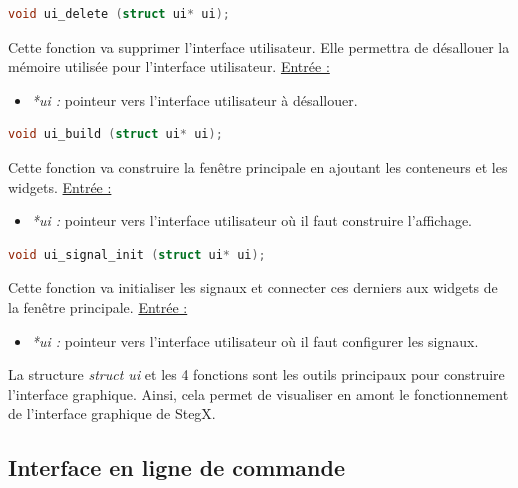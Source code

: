 \documentclass[11pt]{article}
\begin{document}
\begin{lstlisting}[language=c]
void ui_delete (struct ui* ui);
\end{lstlisting}

Cette fonction va supprimer l'interface utilisateur. Elle permettra de 
désallouer la mémoire utilisée pour l'interface utilisateur. 
\newline
\underline{Entrée :} 
\begin{itemize}
\item \textit{*ui :} pointeur vers l'interface utilisateur à désallouer. 
\newline 
\end{itemize}

\begin{lstlisting}[language=c]
void ui_build (struct ui* ui);
\end{lstlisting}

Cette fonction va construire la fenêtre principale en ajoutant les conteneurs 
et les widgets. 
\newline
\underline{Entrée :} 
\begin{itemize}
\item \textit{*ui :} pointeur vers l'interface utilisateur où il faut construire 
l'affichage. 
\newline 
\end{itemize}

\begin{lstlisting}[language=c]
void ui_signal_init (struct ui* ui);
\end{lstlisting}

Cette fonction va initialiser les signaux et connecter ces derniers aux 
widgets de la fenêtre principale. 
\newline
\underline{Entrée :} 
\begin{itemize}
\item \textit{*ui :} pointeur vers l'interface utilisateur où il faut 
configurer les signaux. 
\newline 
\end{itemize}

La structure \textit{struct ui} et les 4 fonctions sont les outils principaux 
pour construire l'interface graphique. Ainsi, cela permet de visualiser 
en amont le fonctionnement de l'interface graphique de StegX. 

\subsection{Interface en ligne de commande}
\end{document}
